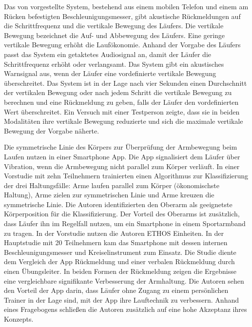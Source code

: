 Das von \citet[][]{Eriksson2010} vorgestellte System, bestehend aus einem mobilen Telefon und einem am Rücken befestigten Beschleunigungsmesser, gibt akustische Rückmeldungen auf die Schrittfrequenz und die vertikale Bewegung des Läufers. Die vertikale Bewegung bezeichnet die Auf- und Abbewegung des Läufers. Eine geringe vertikale Bewegung erhöht die Laufökonomie. Anhand der Vorgabe des Läufers passt das System ein getaktetes Audiosignal an, damit der Läufer die Schrittfrequenz erhöht oder verlangsamt. Das System gibt ein akustisches Warnsignal aus, wenn der Läufer eine vordefinierte vertikale Bewegung überschreitet. Das System ist in der Lage nach vier Sekunden einen Durchschnitt der vertikalen Bewegung oder nach jedem Schritt die vertikale Bewegung zu berechnen und eine Rückmeldung zu geben, falls der Läufer den vordefinierten Wert überschreitet. Ein Versuch mit einer Testperson zeigte, dass sie in beiden Modalitäten ihre vertikale Bewegung reduzierte und sich die maximale vertikale Bewegung der Vorgabe näherte.

Die symmetrische Linie des Körpers zur Überprüfung der Armbewegung beim Laufen nutzen \citet{Strohrmann2013, Strohrmann2014} in einer Smartphone App. Die App signalisiert dem Läufer über Vibration, wenn die Armbewegung nicht parallel zum Körper verläuft. In einer Vorstudie mit zehn Teilnehmern trainierten \citet{Strohrmann2013} einen Algorithmus zur Klassifizierung der drei Haltungsfälle: Arme laufen parallel zum Körper (ökonomischste Haltung), Arme zielen zur symmetrischen Linie und Arme kreuzen die symmetrische Linie. Die Autoren identifizierten den Oberarm als geeignetste Körperposition für die Klassifizierung. Der Vorteil des Oberarms ist zusätzlich, dass Läufer ihn im Regelfall nutzen, um ein Smartphone in einem Sportarmband zu tragen. In der Vorstudie nutzen die Autoren ETHOS Einheiten. In der Hauptstudie mit 20 Teilnehmern kam das Smartphone mit dessen internen Beschleunigungsmesser und Kreiselinstrument zum Einsatz. Die Studie diente dem Vergleich der App Rückmeldung und einer verbalen Rückmeldung durch einen Übungsleiter. In beiden Formen der Rückmeldung zeigen die Ergebnisse eine vergleichbare signifikante Verbesserung der Armhaltung. Die Autoren sehen den Vorteil der App darin, dass Läufer ohne Zugang zu einem persönlichen Trainer in der Lage sind, mit der App ihre Lauftechnik zu verbessern. Anhand eines Fragebogens schließen die Autoren zusätzlich auf eine hohe Akzeptanz ihres Konzepts.

